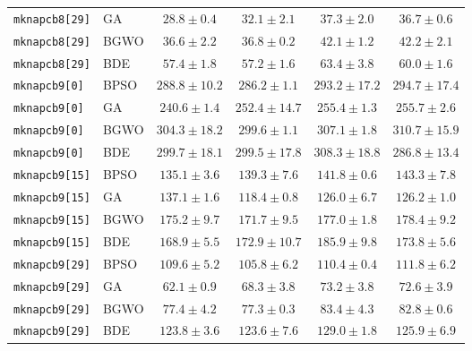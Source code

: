 \documentclass[journal,article,submit,moreauthors]{Definitions/mdpi}
\begin{document}
\begin{longtable}{llcccc}
    \texttt{mknapcb8[29]} & GA    &  $\mathbf{28.8 \pm 0.4}$ &           $32.1 \pm 2.1$ &           $37.3 \pm 2.0$ &           $36.7 \pm 0.6$ \\
    \texttt{mknapcb8[29]} & BGWO  &  $\mathbf{36.6 \pm 2.2}$ &           $36.8 \pm 0.2$ &           $42.1 \pm 1.2$ &           $42.2 \pm 2.1$ \\
    \texttt{mknapcb8[29]} & BDE   &           $57.4 \pm 1.8$ &  $\mathbf{57.2 \pm 1.6}$ &           $63.4 \pm 3.8$ &           $60.0 \pm 1.6$ \\
    \midrule
    \texttt{mknapcb9[0]} & BPSO  &         $288.8 \pm 10.2$ & $\mathbf{286.2 \pm 1.1}$ &         $293.2 \pm 17.2$ &         $294.7 \pm 17.4$ \\
    \texttt{mknapcb9[0]} & GA    & $\mathbf{240.6 \pm 1.4}$ &         $252.4 \pm 14.7$ &          $255.4 \pm 1.3$ &          $255.7 \pm 2.6$ \\
    \texttt{mknapcb9[0]} & BGWO  &         $304.3 \pm 18.2$ & $\mathbf{299.6 \pm 1.1}$ &          $307.1 \pm 1.8$ &         $310.7 \pm 15.9$ \\
    \texttt{mknapcb9[0]} & BDE   &         $299.7 \pm 18.1$ &         $299.5 \pm 17.8$ &         $308.3 \pm 18.8$ & $\mathbf{286.8 \pm 13.4}$ \\
    \midrule
    \texttt{mknapcb9[15]} & BPSO  & $\mathbf{135.1 \pm 3.6}$ &          $139.3 \pm 7.6$ &          $141.8 \pm 0.6$ &          $143.3 \pm 7.8$ \\
    \texttt{mknapcb9[15]} & GA    &          $137.1 \pm 1.6$ & $\mathbf{118.4 \pm 0.8}$ &          $126.0 \pm 6.7$ &          $126.2 \pm 1.0$ \\
    \texttt{mknapcb9[15]} & BGWO  &          $175.2 \pm 9.7$ & $\mathbf{171.7 \pm 9.5}$ &          $177.0 \pm 1.8$ &          $178.4 \pm 9.2$ \\
    \texttt{mknapcb9[15]} & BDE   & $\mathbf{168.9 \pm 5.5}$ &         $172.9 \pm 10.7$ &          $185.9 \pm 9.8$ &          $173.8 \pm 5.6$ \\
    \midrule
    \texttt{mknapcb9[29]} & BPSO  &          $109.6 \pm 5.2$ & $\mathbf{105.8 \pm 6.2}$ &          $110.4 \pm 0.4$ &          $111.8 \pm 6.2$ \\
    \texttt{mknapcb9[29]} & GA    &  $\mathbf{62.1 \pm 0.9}$ &           $68.3 \pm 3.8$ &           $73.2 \pm 3.8$ &           $72.6 \pm 3.9$ \\
    \texttt{mknapcb9[29]} & BGWO  &           $77.4 \pm 4.2$ &  $\mathbf{77.3 \pm 0.3}$ &           $83.4 \pm 4.3$ &           $82.8 \pm 0.6$ \\
    \texttt{mknapcb9[29]} & BDE   &          $123.8 \pm 3.6$ & $\mathbf{123.6 \pm 7.6}$ &          $129.0 \pm 1.8$ &          $125.9 \pm 6.9$ \\
\end{longtable}
\endgroup
\end{document}
